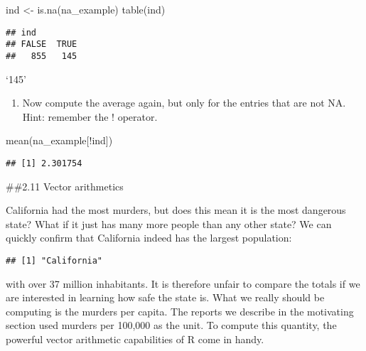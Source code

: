 \documentclass[
]{article}
\newenvironment{Shaded}{\begin{snugshade}}{\end{snugshade}}
\newcommand{\FunctionTok}[1]{\textcolor[rgb]{0.00,0.00,0.00}{#1}}
\newcommand{\NormalTok}[1]{#1}
\newcommand{\OtherTok}[1]{\textcolor[rgb]{0.56,0.35,0.01}{#1}}
\newcommand{\SpecialCharTok}[1]{\textcolor[rgb]{0.00,0.00,0.00}{#1}}
\newcommand{\StringTok}[1]{\textcolor[rgb]{0.31,0.60,0.02}{#1}}
\providecommand{\tightlist}{%
  \setlength{\itemsep}{0pt}\setlength{\parskip}{0pt}}
\begin{document}
\begin{Shaded}
\begin{Highlighting}[]
\NormalTok{ind }\OtherTok{\textless{}{-}} \FunctionTok{is.na}\NormalTok{(na\_example)}
\FunctionTok{table}\NormalTok{(ind)}
\end{Highlighting}
\end{Shaded}

\begin{verbatim}
## ind
## FALSE  TRUE 
##   855   145
\end{verbatim}

`145'

\begin{enumerate}
\def\labelenumi{\arabic{enumi}.}
\setcounter{enumi}{7}
\tightlist
\item
  Now compute the average again, but only for the entries that are not
  NA. Hint: remember the ! operator.
\end{enumerate}

\begin{Shaded}
\begin{Highlighting}[]
\FunctionTok{mean}\NormalTok{(na\_example[}\SpecialCharTok{!}\NormalTok{ind])}
\end{Highlighting}
\end{Shaded}

\begin{verbatim}
## [1] 2.301754
\end{verbatim}

\#\#2.11 Vector arithmetics

California had the most murders, but does this mean it is the most
dangerous state? What if it just has many more people than any other
state? We can quickly confirm that California indeed has the largest
population:

\begin{Shaded}
\end{Shaded}

\begin{verbatim}
## [1] "California"
\end{verbatim}

with over 37 million inhabitants. It is therefore unfair to compare the
totals if we are interested in learning how safe the state is. What we
really should be computing is the murders per capita. The reports we
describe in the motivating section used murders per 100,000 as the unit.
To compute this quantity, the powerful vector arithmetic capabilities of
R come in handy.
\end{document}
